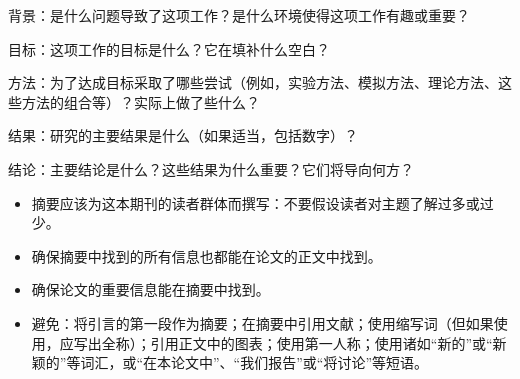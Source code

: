 背景：是什么问题导致了这项工作？是什么环境使得这项工作有趣或重要？

目标：这项工作的目标是什么？它在填补什么空白？

方法：为了达成目标采取了哪些尝试（例如，实验方法、模拟方法、理论方法、这些方法的组合等）？实际上做了些什么？

结果：研究的主要结果是什么（如果适当，包括数字）？

结论：主要结论是什么？这些结果为什么重要？它们将导向何方？

\begin{itemize}
\item 摘要应该为这本期刊的读者群体而撰写：不要假设读者对主题了解过多或过少。
\item 确保摘要中找到的所有信息也都能在论文的正文中找到。
\item 确保论文的重要信息能在摘要中找到。
\item 避免：将引言的第一段作为摘要；在摘要中引用文献；使用缩写词（但如果使用，应写出全称）；引用正文中的图表；使用第一人称；使用诸如“新的”或“新颖的”等词汇，或“在本论文中”、“我们报告”或“将讨论”等短语。
\end{itemize}

